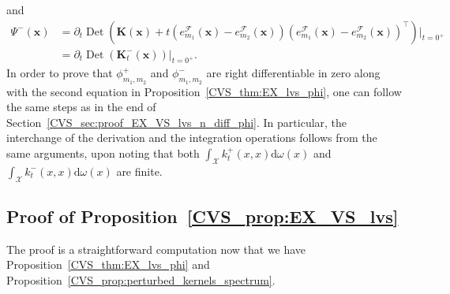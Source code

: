 \documentclass[twoside,11pt]{book}
\numberwithin{theorem}{chapter}
\numberwithin{definition}{chapter}
\numberwithin{proposition}{chapter}
\numberwithin{corollary}{chapter}
\numberwithin{example}{chapter}
\numberwithin{lemma}{chapter}
\numberwithin{assumption}{chapter}
\DeclareMathOperator{\Det}{Det}
\DeclareMathOperator{\Tran}{\intercal}
\DeclareMathOperator{\X}{\mathcal{X}}
\newcommand{\ab}[1]{\textcolor{red}{#1}}
\begin{document}
and
\begin{align}
\Psi^{-}(\bm{x}) & = \partial_{t} \Det \left(\bm{K}(\bm{x})+t \left(e_{m_{1}}^{\mathcal{F}}(\bm{x}) - e_{m_{2}}^{\mathcal{F}}(\bm{x}) \right)\left(e_{m_{1}}^{\mathcal{F}}(\bm{x}) - e_{m_{2}}^{\mathcal{F}}(\bm{x}) \right)^{\Tran} \right)|_{t = 0^{+}} \nonumber \\
& = \partial_{t} \Det \left(\bm{K}_{t}^{-}(\bm{x})\right)|_{t = 0^{+}}.
\end{align}
In order to prove that $\phi_{m_{1},m_{2}}^{+}$ and $\phi_{m_{1},m_{2}}^{-}$ are right differentiable in zero along with the second equation in Proposition~\ref{CVS_thm:EX_lvs_phi}, one can follow the same steps as in the end of Section~\ref{CVS_sec:proof_EX_VS_lvs_n_diff_phi}. In particular, the interchange of the derivation and the integration operations follows from the same arguments, upon noting that both $\int_{\X} k_{t}^{+}(x,x) \mathrm{d}\omega(x)$ and $\int_{\X} k_{t}^{-}(x,x) \mathrm{d}\omega(x)$ are finite.



\subsection{Proof of Proposition~\ref{CVS_prop:EX_VS_lvs}}\label{CVS_sec:proof_EX_VS_lvs}
The proof is a straightforward computation now that we have Proposition~\ref{CVS_thm:EX_lvs_phi} and Proposition~\ref{CVS_prop:perturbed_kernels_spectrum}.
\end{document}
